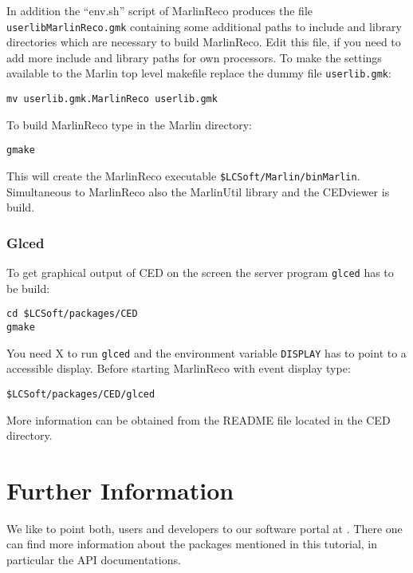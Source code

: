 In addition the ``env.sh'' script of MarlinReco produces the file
{\tt userlibMarlinReco.gmk} containing some additional paths
to include and library directories which are necessary to build
MarlinReco. Edit this file, if you need to add
more include and library paths for own processors. To make the settings
available to the Marlin top level makefile replace the dummy file
{\tt userlib.gmk}:

\begin{verbatim}
mv userlib.gmk.MarlinReco userlib.gmk
\end{verbatim}

To build MarlinReco type in the Marlin directory:

\begin{verbatim}
gmake
\end{verbatim}

This will create the MarlinReco executable {\tt \$LCSoft/Marlin/binMarlin}.
Simultaneous to MarlinReco also the MarlinUtil library and the CEDviewer is
build.

\subsubsection*{Glced}

To get graphical output of CED on the screen the server program {\tt glced}
has to be build:

\begin{verbatim}
cd $LCSoft/packages/CED
gmake
\end{verbatim}

You need X to run {\tt glced} and the environment variable
{\tt DISPLAY} has to point to a accessible display. Before starting
MarlinReco with event display type:

\begin{verbatim}
$LCSoft/packages/CED/glced
\end{verbatim}

More information can be obtained from the README file located in the
CED directory.

\section{Further Information}

We like to point both, users and developers to our software portal at
.
There one can find more information about the packages mentioned in this
tutorial, in particular the API documentations.

